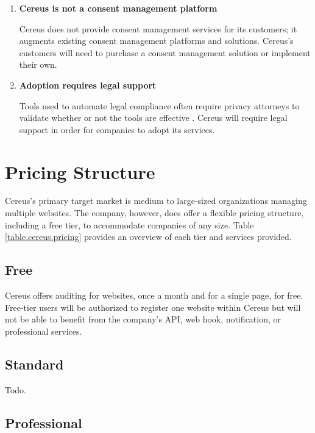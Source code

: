 \begin{enumerate}

  \item \textbf{Cereus is not a consent management platform}

  Cereus does not provide consent management services for its customers; it augments existing consent management platforms and solutions. Cereus's customers will need to purchase a consent management solution or implement their own.

  \item \textbf{Adoption requires legal support}

  Tools used to automate legal compliance often require privacy attorneys to validate whether or not the tools are effective \cite{bloomlaw.2019}. Cereus will require legal support in order for companies to adopt its services.

\end{enumerate}

\section{Pricing Structure}

Cereus's primary target market is medium to large-sized organizations managing multiple websites. The company, however, does offer a flexible pricing structure, including a free tier, to accommodate companies of any size. Table \ref{table.cereus.pricing} provides an overview of each tier and services provided.

\subsection{Free}

Cereus offers auditing for websites, once a month and for a single page, for free. Free-tier users will be authorized to register one website within Cereus but will not be able to benefit from the company's API, web hook, notification, or professional services.

\subsection{Standard}

Todo.

\subsection{Professional}

